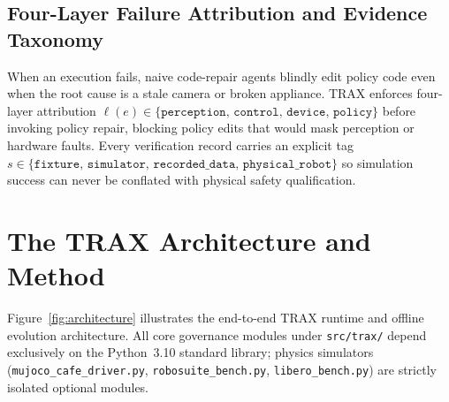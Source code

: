 \documentclass{trax}
\begin{document}
\subsection{Four-Layer Failure Attribution and Evidence Taxonomy}
When an execution fails, naive code-repair agents blindly edit policy code even when the root cause is a stale camera or broken appliance. TRAX enforces four-layer attribution $\ell(e) \in \{\texttt{perception},\, \texttt{control},\, \texttt{device},\, \texttt{policy}\}$ before invoking policy repair, blocking policy edits that would mask perception or hardware faults. Every verification record carries an explicit tag $s \in \{\texttt{fixture},\, \texttt{simulator},\, \texttt{recorded\_data},\, \texttt{physical\_robot}\}$ so simulation success can never be conflated with physical safety qualification.

\section{The TRAX Architecture and Method}
\label{sec:method}

Figure~\ref{fig:architecture} illustrates the end-to-end TRAX runtime and offline evolution architecture. All core governance modules under \texttt{src/trax/} depend exclusively on the Python~3.10 standard library; physics simulators (\texttt{mujoco\_cafe\_driver.py}, \texttt{robosuite\_bench.py}, \texttt{libero\_bench.py}) are strictly isolated optional modules.
\end{document}

